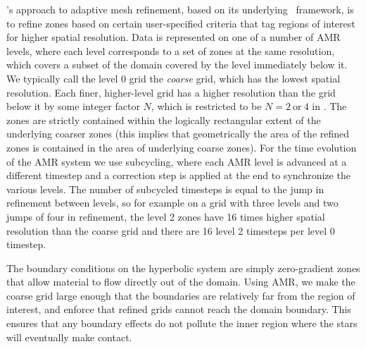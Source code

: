 \documentclass[12pt]{article}
\begin{document}
\castro's approach to adaptive mesh refinement, based on its underlying
\boxlib\ framework, is to refine zones based on certain user-specified
criteria that tag regions of interest for higher spatial
resolution. Data is represented on one of a number of AMR levels,
where each level corresponds to a set of zones at the same resolution,
which covers a subset of the domain covered by the level immediately
below it. We typically call the level 0 grid the \textit{coarse} grid,
which has the lowest spatial resolution. Each finer, higher-level grid
has a higher resolution than the grid below it by some integer factor
$N$, which is restricted to be $N = 2\ \text{or}\ 4$ in \castro. The
zones are strictly contained within the logically rectangular extent of the
underlying coarser zones (this implies that geometrically the area of the
refined zones is contained in the area of underlying coarse zones). For the time
evolution of the AMR system we use subcycling, where each AMR level is
advanced at a different timestep and a correction step is applied at
the end to synchronize the various levels. The number of
subcycled timesteps is equal to the jump in refinement between levels,
so for example on a grid with three levels and two jumps of four in
refinement, the level 2 zones have 16 times higher spatial
resolution than the coarse grid and there are 16 level 2 timesteps
per level 0 timestep.

The boundary conditions on the hyperbolic system are simply
zero-gradient zones that allow material to flow directly out of the
domain. Using AMR, we make the coarse grid large enough that the
boundaries are relatively far from the region of interest, and enforce
that refined grids cannot reach the domain boundary. This
ensures that any boundary effects do not pollute the inner region
where the stars will eventually make contact.
\end{document}
